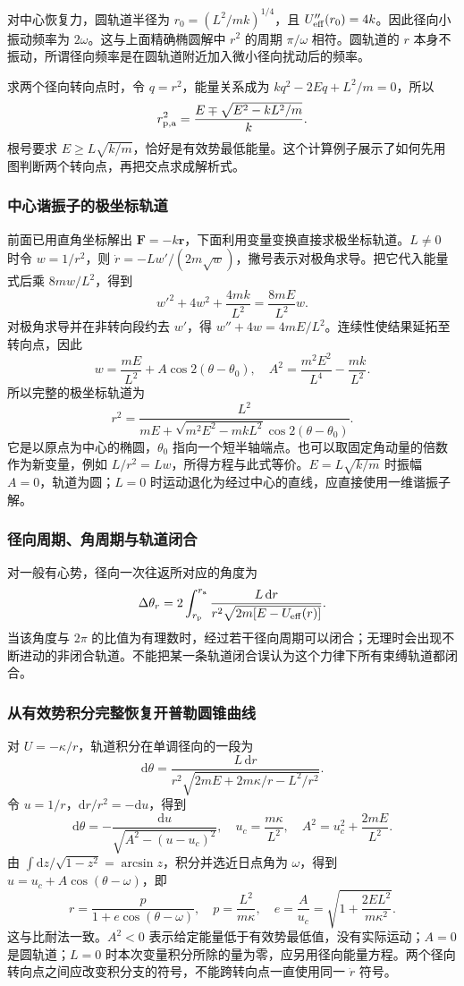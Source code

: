 \documentclass[UTF8,zihao=-4,fontset=fandol,a4paper]{ctexart}
\newcommand{\vect}[1]{\bm{#1}}
\newcommand{\dd}{\mathrm d}
\begin{document}
对中心恢复力，圆轨道半径为 $r_0=(L^2/mk)^{1/4}$，且 $U_{\rm eff}''(r_0)=4k$。因此径向小振动频率为 $2\omega$。这与上面精确椭圆解中 $r^2$ 的周期 $\pi/\omega$ 相符。圆轨道的 $r$ 本身不振动，所谓径向频率是在圆轨道附近加入微小径向扰动后的频率。

求两个径向转向点时，令 $q=r^2$，能量关系成为 $kq^2-2Eq+L^2/m=0$，所以
\[
r_{\rm p,a}^2=\frac{E\mp\sqrt{E^2-kL^2/m}}k.
\]
根号要求 $E\geq L\sqrt{k/m}$，恰好是有效势最低能量。这个计算例子展示了如何先用图判断两个转向点，再把交点求成解析式。



\subsubsection*{中心谐振子的极坐标轨道}
\label{ex:hooke-polar}
前面已用直角坐标解出 $\vect F=-k\vect r$，下面利用变量变换直接求极坐标轨道。$L\neq0$ 时令 $w=1/r^2$，则 $\dot r=-Lw'/(2m\sqrt w)$，撇号表示对极角求导。把它代入能量式后乘 $8mw/L^2$，得到
\[
w'^2+4w^2+\frac{4mk}{L^2}=\frac{8mE}{L^2}w.
\]
对极角求导并在非转向段约去 $w'$，得 $w''+4w=4mE/L^2$。连续性使结果延拓至转向点，因此
\[
w=\frac{mE}{L^2}+A\cos2(\theta-\theta_0),
\quad A^2=\frac{m^2E^2}{L^4}-\frac{mk}{L^2}.
\]
所以完整的极坐标轨道为
\[
r^2=\frac{L^2}{mE+\sqrt{m^2E^2-mkL^2}\cos2(\theta-\theta_0)}.
\]
它是以原点为中心的椭圆，$\theta_0$ 指向一个短半轴端点。也可以取固定角动量的倍数作为新变量，例如 $L/r^2=Lw$，所得方程与此式等价。$E=L\sqrt{k/m}$ 时振幅 $A=0$，轨道为圆；$L=0$ 时运动退化为经过中心的直线，应直接使用一维谐振子解。

\subsubsection*{径向周期、角周期与轨道闭合}

对一般有心势，径向一次往返所对应的角度为
\[
\Delta\theta_r=2\int_{r_{\rm p}}^{r_{\rm a}}
\frac{L\,\dd r}{r^2\sqrt{2m[E-U_{\mathrm{eff}}(r)]}}.
\]
当该角度与 $2\pi$ 的比值为有理数时，经过若干径向周期可以闭合；无理时会出现不断进动的非闭合轨道。不能把某一条轨道闭合误认为这个力律下所有束缚轨道都闭合。



\subsubsection*{从有效势积分完整恢复开普勒圆锥曲线}\label{topic:keplerintegral}

对 $U=-\kappa/r$，轨道积分在单调径向的一段为
\[
\dd\theta=\frac{L\,\dd r}{r^2\sqrt{2mE+2m\kappa/r-L^2/r^2}}.
\]
令 $u=1/r$，$\dd r/r^2=-\dd u$，得到
\[
\dd\theta=-\frac{\dd u}{\sqrt{A^2-(u-u_c)^2}},
\quad u_c=\frac{m\kappa}{L^2},
\quad A^2=u_c^2+\frac{2mE}{L^2}.
\]
由 $\int\dd z/\sqrt{1-z^2}=\arcsin z$，积分并选近日点角为 $\omega$，得到 $u=u_c+A\cos(\theta-\omega)$，即
\[
r=\frac{p}{1+e\cos(\theta-\omega)},\quad
 p=\frac{L^2}{m\kappa},\quad
 e=\frac A{u_c}=\sqrt{1+\frac{2EL^2}{m\kappa^2}}.
\]
这与比耐法一致。$A^2<0$ 表示给定能量低于有效势最低值，没有实际运动；$A=0$ 是圆轨道；$L=0$ 时本次变量积分所除的量为零，应另用径向能量方程。两个径向转向点之间应改变积分支的符号，不能跨转向点一直使用同一 $\dot r$ 符号。
\end{document}
